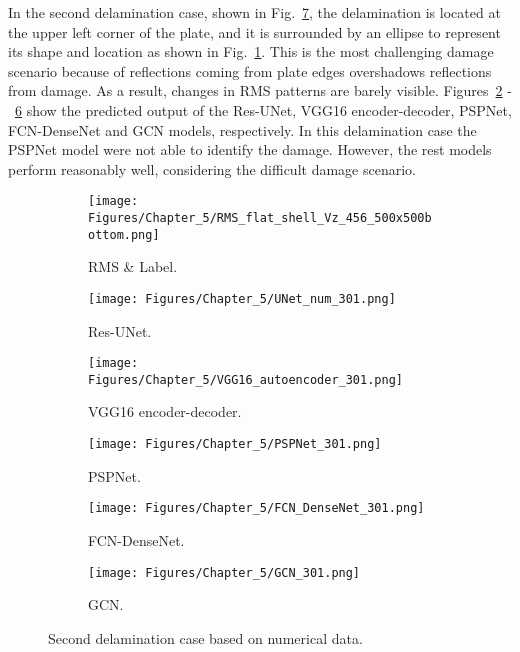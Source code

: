 In the second delamination case, shown in Fig.~\ref{fig:rms_second_case}, the delamination is located at the upper left corner of the plate, and it is surrounded by an ellipse to represent its shape and location as shown in Fig.~\ref{fig:RMS_bottom_456}.
This is the most challenging damage scenario because of reflections coming from plate edges overshadows reflections from damage.
As a result, changes in RMS patterns are barely visible.
Figures~\ref{fig:unet_301} -~\ref{fig:gcn_301} show the predicted output of the Res-UNet, VGG16 encoder-decoder, PSPNet, FCN-DenseNet and GCN models, respectively. 
In this delamination case the PSPNet model were not able to identify the damage.
However, the rest models perform reasonably well, considering the difficult damage scenario.
\begin{figure} [!h]
	\centering
	\begin{subfigure}[b]{.48\textwidth}
		\centering
		\texttt{[image: Figures/Chapter\_5/RMS\_flat\_shell\_Vz\_456\_500x500bottom.png]}
		\caption{RMS \& Label.}
		\label{fig:RMS_bottom_456}
	\end{subfigure}
	\hfill
	\begin{subfigure}[b]{.48\textwidth}
		\centering
		\texttt{[image: Figures/Chapter\_5/UNet\_num\_301.png]}
		\caption{Res-UNet.}
		\label{fig:unet_301}	
	\end{subfigure}
	\hfill
	\begin{subfigure}[b]{.48\textwidth}
		\centering
		\texttt{[image: Figures/Chapter\_5/VGG16\_autoencoder\_301.png]}
		\caption{VGG16 encoder-decoder.}
		\label{fig:vgg16_301}
	\end{subfigure}
	\hfill
	\begin{subfigure}[b]{.48\textwidth}
		\centering
		\texttt{[image: Figures/Chapter\_5/PSPNet\_301.png]}
		\caption{PSPNet.}
		\label{fig:pspnet_301}	
	\end{subfigure}
	\hfill
	\begin{subfigure}[b]{.48\textwidth}
		\centering
		\texttt{[image: Figures/Chapter\_5/FCN\_DenseNet\_301.png]}
		\caption{FCN-DenseNet.}
		\label{fig:densenet_301}
	\end{subfigure}
	\hfill
	\begin{subfigure}[b]{.48\textwidth}
		\centering
		\texttt{[image: Figures/Chapter\_5/GCN\_301.png]}
		\caption{GCN.}
		\label{fig:gcn_301}	
	\end{subfigure}
	\caption{Second delamination case based on numerical data.}
	\label{fig:rms_second_case}
\end{figure}

